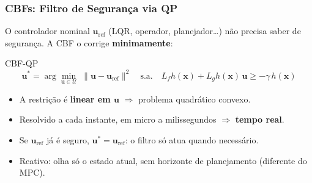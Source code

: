 \begin{frame}

    \frametitle{CBFs: Filtro de Segurança via QP}

    O controlador nominal $\boldsymbol{u}_{\text{ref}}$ (LQR, operador, planejador\ldots) não precisa saber de segurança. A CBF o corrige \textbf{minimamente}:

    \begin{block}{CBF-QP}
        \[
            \boldsymbol{u}^* = \arg\min_{\boldsymbol{u} \in \mathcal{U}} \; \|\boldsymbol{u} - \boldsymbol{u}_{\text{ref}}\|^2
            \quad \text{s.a.} \quad
            L_f h(\boldsymbol{x}) + L_g h(\boldsymbol{x})\, \boldsymbol{u} \geq -\gamma\, h(\boldsymbol{x})
        \]
    \end{block}

    \begin{itemize}
        \item A restrição é \textbf{linear em $\boldsymbol{u}$} $\Rightarrow$ problema quadrático convexo.
        \item Resolvido a cada instante, em micro a milissegundos $\Rightarrow$ \textbf{tempo real}.
        \item Se $\boldsymbol{u}_{\text{ref}}$ já é seguro, $\boldsymbol{u}^* = \boldsymbol{u}_{\text{ref}}$: o filtro só atua quando necessário.
        \item Reativo: olha só o estado atual, sem horizonte de planejamento (diferente do MPC).
    \end{itemize}

\end{frame}


